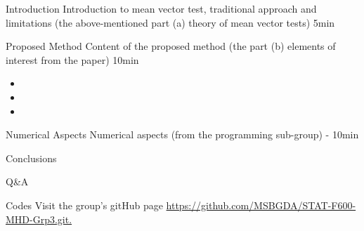\documentclass{beamer}
\begin{document}
\maketitle





\begin{frame}{Introduction}
 Introduction to mean vector test, traditional approach and limitations (the above-mentioned part (a) theory of mean vector tests)  5min  
\end{frame}

\begin{frame}{Proposed Method}
Content of the proposed method (the part (b) elements of interest from the paper)  10min
 \begin{itemize}
     \item 
     \item 
     \item 

 \end{itemize}   
\end{frame}

\begin{frame}{Numerical Aspects}
Numerical aspects (from the programming sub-group) - 10min
    
\end{frame}

\begin{frame}{Conclusions}

    
\end{frame}

\begin{frame}{Q\&A}

    
\end{frame}

\begin{frame}{Codes}
Visit the group's gitHub page 
\url{https://github.com/MSBGDA/STAT-F600-MHD-Grp3.git.}
    
\end{frame}
\end{document}
